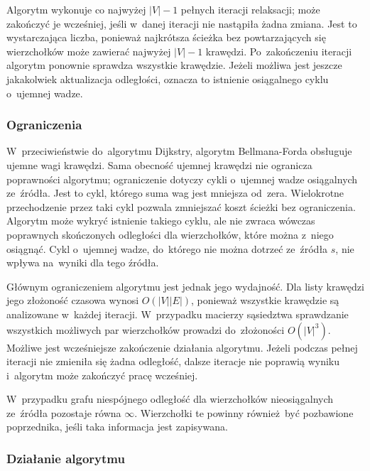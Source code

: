 \documentclass[11pt,a4paper,oneside]{report}
\begin{document}
Algorytm wykonuje co najwyżej $|V|-1$ pełnych iteracji relaksacji; może zakończyć je wcześniej, jeśli w~danej iteracji nie nastąpiła żadna zmiana. Jest to wystarczająca liczba, ponieważ najkrótsza ścieżka bez powtarzających się wierzchołków może zawierać najwyżej $|V|-1$ krawędzi. Po~zakończeniu iteracji algorytm ponownie sprawdza wszystkie krawędzie. Jeżeli możliwa jest jeszcze jakakolwiek aktualizacja odległości, oznacza to istnienie osiągalnego cyklu o~ujemnej wadze.

\subsubsection{Ograniczenia}

W~przeciwieństwie do~algorytmu Dijkstry, algorytm Bellmana-Forda obsługuje ujemne wagi krawędzi. Sama obecność ujemnej krawędzi nie ogranicza poprawności algorytmu; ograniczenie dotyczy cykli o~ujemnej wadze osiągalnych ze~źródła. Jest to cykl, którego suma wag jest mniejsza od~zera. Wielokrotne przechodzenie przez taki cykl pozwala zmniejszać koszt ścieżki bez ograniczenia. Algorytm może wykryć istnienie takiego cyklu, ale nie zwraca wówczas poprawnych skończonych odległości dla wierzchołków, które można z~niego osiągnąć. Cykl o~ujemnej wadze, do~którego nie można dotrzeć ze~źródła $s$, nie wpływa na~wyniki dla tego źródła.

Głównym ograniczeniem algorytmu jest jednak jego wydajność. Dla listy krawędzi jego złożoność czasowa wynosi $O(|V||E|)$, ponieważ wszystkie krawędzie są analizowane w~każdej iteracji. W~przypadku macierzy sąsiedztwa sprawdzanie wszystkich możliwych par wierzchołków prowadzi do~złożoności $O(|V|^3)$. Możliwe jest wcześniejsze zakończenie działania algorytmu. Jeżeli podczas pełnej iteracji nie zmieniła się żadna odległość, dalsze iteracje nie poprawią wyniku i~algorytm może zakończyć pracę wcześniej.

W~przypadku grafu niespójnego odległość dla wierzchołków nieosiągalnych ze~źródła pozostaje równa $\infty$. Wierzchołki te powinny również być pozbawione poprzednika, jeśli taka informacja jest zapisywana.

\newpage

\subsubsection{Działanie algorytmu}
\end{document}
